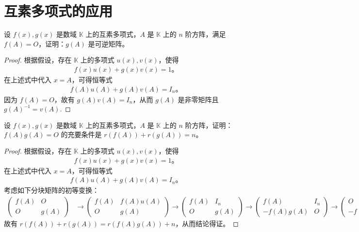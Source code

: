 \documentclass[../../main.tex]{subfiles}
\begin{document}
\section{互素多项式的应用}

\begin{proposition}
设 $f(x), g(x)$ 是数域 $\mathbb{K}$ 上的互素多项式，$A$ 是 $\mathbb{K}$ 上的 $n$ 阶方阵，满足 $f(A) = O$，证明：$g(A)$ 是可逆矩阵。
\end{proposition}
\begin{proof}
根据假设，存在 $\mathbb{K}$ 上的多项式 $u(x), v(x)$，使得
\begin{align*}
f(x)u(x) + g(x)v(x) = 1。
\end{align*}
在上述式中代入 $x = A$，可得恒等式
\begin{align*}
f(A)u(A) + g(A)v(A) = I_n。
\end{align*}
因为 $f(A) = O$，故有 $g(A)v(A) = I_n$，从而 $g(A)$ 是非零矩阵且 $g(A)^{-1} = v(A)$.

\end{proof}

\begin{proposition}
设 $f(x), g(x)$ 是数域 $\mathbb{K}$ 上的互素多项式，$A$ 是 $\mathbb{K}$ 上的 $n$ 阶方阵，证明：$f(A)g(A) = O$ 的充要条件是 $r(f(A)) + r(g(A)) = n$。
\end{proposition}
\begin{proof}
根据假设，存在 $\mathbb{K}$ 上的多项式 $u(x), v(x)$，使得
\begin{align*}
f(x)u(x) + g(x)v(x) = 1。
\end{align*}
在上述式中代入 $x = A$，可得恒等式
\begin{align*}
f(A)u(A) + g(A)v(A) = I_n。
\end{align*}
考虑如下分块矩阵的初等变换：
\begin{align*}
\begin{pmatrix}
f(A) & O \\
O & g(A)
\end{pmatrix}
&\to
\begin{pmatrix}
f(A) & f(A)u(A) \\
O & g(A)
\end{pmatrix}
\to
\begin{pmatrix}
f(A) & I_n \\
O & g(A)
\end{pmatrix}
\to
\begin{pmatrix}
f(A) & I_n \\
-f(A)g(A) & O
\end{pmatrix}
\to
\begin{pmatrix}
O & I_n \\
-f(A)g(A) & O
\end{pmatrix},
\end{align*}
故有 $r(f(A)) + r(g(A)) = r(f(A)g(A)) + n$，从而结论得证。

\end{proof}
\end{document}
